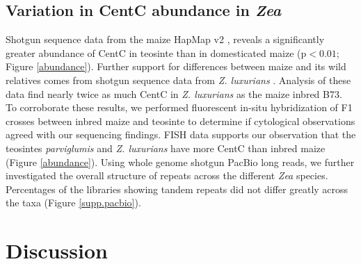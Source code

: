 \subsection*{Variation in CentC abundance in \emph{Zea}}

Shotgun sequence data from the maize HapMap v2 \citep{Chia2012}, reveals a significantly greater abundance of CentC in teosinte than in domesticated maize (p$<0.01$; Figure \ref{abundance}).   Further support for differences between maize and its wild relatives comes from shotgun sequence data from \emph{Z. luxurians} \citep{Tenaillon2011}.  Analysis of these data find nearly twice as much CentC in \emph{Z. luxurians} as the maize inbred B73.  To corroborate these results, we performed fluorescent in-situ hybridization of F1 crosses between inbred maize and teosinte to determine if cytological observations agreed with our sequencing findings.   FISH data supports our observation that the teosintes \emph{parviglumis} and \emph{Z. luxurians} have more CentC than inbred maize (Figure \ref{abundance}).  Using whole genome shotgun PacBio long reads, we further investigated the overall structure of repeats across the different \emph{Zea} species.  Percentages of the libraries showing tandem repeats did not differ greatly across the taxa (Figure \ref{supp.pacbio}).

\section*{Discussion}
\label{discussion}




